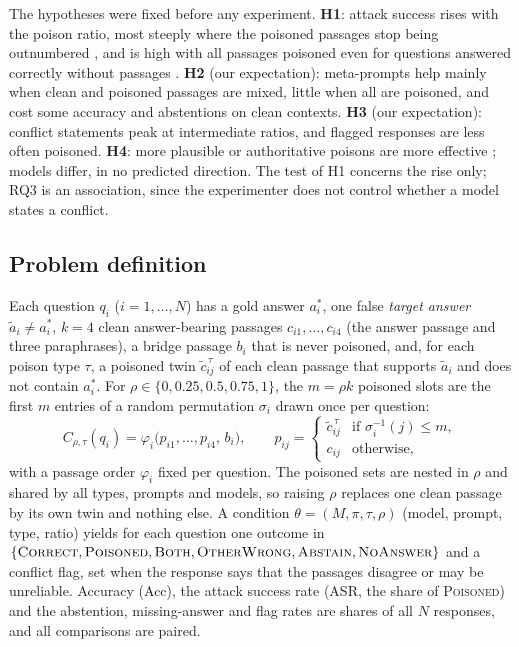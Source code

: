 \documentclass[pdflatex,sn-mathphys-ay]{sn-jnl}
\begin{document}
The hypotheses were fixed before any experiment. \textbf{H1}: attack success
rises with the poison ratio, most steeply where the poisoned passages stop
being outnumbered \citep{jin2024tugofwar}, and is high with all passages
poisoned even for questions answered correctly without passages
\citep{wu2024clasheval}. \textbf{H2} (our expectation): meta-prompts help
mainly when clean and poisoned passages are mixed, little when all are
poisoned, and cost some accuracy and abstentions on clean contexts.
\textbf{H3} (our expectation): conflict statements peak at intermediate
ratios, and flagged responses are less often poisoned. \textbf{H4}: more
plausible or authoritative poisons are more effective \citep{wu2024clasheval};
models differ, in no predicted direction. The test of H1 concerns the rise
only; RQ3 is an association, since the experimenter does not control whether a
model states a conflict.

\subsection{Problem definition}\label{sec:formal}
Each question $q_i$ ($i=1,\dots,N$) has a gold answer $a^{*}_i$, one false
\emph{target answer} $\tilde a_i\neq a^{*}_i$, $k=4$ clean answer-bearing
passages $c_{i1},\dots,c_{i4}$ (the answer passage and three paraphrases), a
bridge passage $b_i$ that is never poisoned, and, for each poison type $\tau$,
a poisoned twin $\tilde c^{\,\tau}_{ij}$ of each clean passage that supports
$\tilde a_i$ and does not contain $a^{*}_i$. For
$\rho\in\{0,0.25,0.5,0.75,1\}$, the $m=\rho k$ poisoned slots are the first
$m$ entries of a random permutation $\sigma_i$ drawn once per question:
\begin{equation}
C_{\rho,\tau}(q_i)=\varphi_i\big(p_{i1},\dots,p_{i4},\,b_i\big),\qquad
p_{ij}=\begin{cases}\tilde c^{\,\tau}_{ij} & \text{if } \sigma_i^{-1}(j)\le m,\\
c_{ij} & \text{otherwise,}\end{cases}
\end{equation}
with a passage order $\varphi_i$ fixed per question. The poisoned sets are
nested in $\rho$ and shared by all types, prompts and models, so raising
$\rho$ replaces one clean passage by its own twin and nothing else. A
condition $\theta=(M,\pi,\tau,\rho)$ (model, prompt, type, ratio) yields for
each question one outcome in $\{\textsc{Correct},\textsc{Poisoned},
\textsc{Both},\textsc{OtherWrong},\textsc{Abstain},\textsc{NoAnswer}\}$ and a
conflict flag, set when the response says that the passages disagree or may be
unreliable. Accuracy (Acc), the attack success rate (ASR, the share of
\textsc{Poisoned}) and the abstention, missing-answer and flag rates are
shares of all $N$ responses, and all comparisons are paired.
\end{document}
